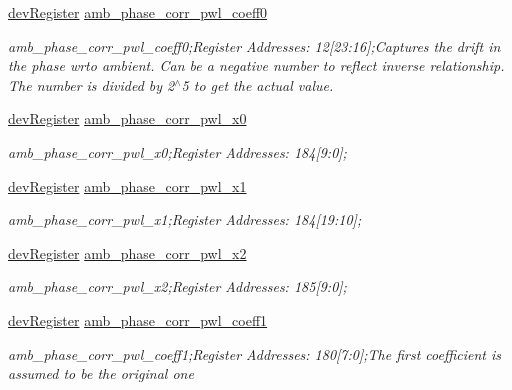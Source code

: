 \begin{DoxyCompactItemize}
\mbox{\hyperlink{classdev_register}{dev\+Register}} \mbox{\hyperlink{class_o_p_t3101_registers_a125c1c1a546fd0aa3a6dfb65419f5f23}{amb\+\_\+phase\+\_\+corr\+\_\+pwl\+\_\+coeff0}}
\begin{DoxyCompactList}\small\item\em amb\+\_\+phase\+\_\+corr\+\_\+pwl\+\_\+coeff0;Register Addresses\+: 12\mbox{[}23\+:16\mbox{]};Captures the drift in the phase wrto ambient. Can be a negative number to reflect inverse relationship. The number is divided by 2$^\wedge$5 to get the actual value. \end{DoxyCompactList}\item 
\mbox{\hyperlink{classdev_register}{dev\+Register}} \mbox{\hyperlink{class_o_p_t3101_registers_afc1ecf406f1e1e2f18720bba2b45aead}{amb\+\_\+phase\+\_\+corr\+\_\+pwl\+\_\+x0}}
\begin{DoxyCompactList}\small\item\em amb\+\_\+phase\+\_\+corr\+\_\+pwl\+\_\+x0;Register Addresses\+: 184\mbox{[}9\+:0\mbox{]}; \end{DoxyCompactList}\item 
\mbox{\hyperlink{classdev_register}{dev\+Register}} \mbox{\hyperlink{class_o_p_t3101_registers_ac691c23d7aa57b8c108269e8d376b868}{amb\+\_\+phase\+\_\+corr\+\_\+pwl\+\_\+x1}}
\begin{DoxyCompactList}\small\item\em amb\+\_\+phase\+\_\+corr\+\_\+pwl\+\_\+x1;Register Addresses\+: 184\mbox{[}19\+:10\mbox{]}; \end{DoxyCompactList}\item 
\mbox{\hyperlink{classdev_register}{dev\+Register}} \mbox{\hyperlink{class_o_p_t3101_registers_ac6140f0f9204013c8bbd7a620704381c}{amb\+\_\+phase\+\_\+corr\+\_\+pwl\+\_\+x2}}
\begin{DoxyCompactList}\small\item\em amb\+\_\+phase\+\_\+corr\+\_\+pwl\+\_\+x2;Register Addresses\+: 185\mbox{[}9\+:0\mbox{]}; \end{DoxyCompactList}\item 
\mbox{\hyperlink{classdev_register}{dev\+Register}} \mbox{\hyperlink{class_o_p_t3101_registers_ade8aba1677f94748cfe40e44254331a3}{amb\+\_\+phase\+\_\+corr\+\_\+pwl\+\_\+coeff1}}
\begin{DoxyCompactList}\small\item\em amb\+\_\+phase\+\_\+corr\+\_\+pwl\+\_\+coeff1;Register Addresses\+: 180\mbox{[}7\+:0\mbox{]};The first coefficient is assumed to be the original one \end{DoxyCompactList}\item 

\end{DoxyCompactItemize}
